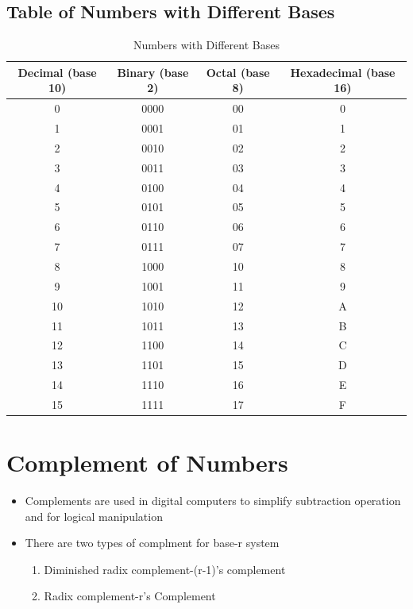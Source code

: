 \documentclass[a4paper,12pt]{article}
\begin{document}
	\subsection*{Table of Numbers with Different Bases}
	\begin{table}[h!]
		\centering
		\begin{tabular}{cccc}
			\toprule
			\textbf{Decimal (base 10)} & \textbf{Binary (base 2)} & \textbf{Octal (base 8)} & \textbf{Hexadecimal (base 16)} \\
			\midrule
			0 & 0000 & 00 & 0 \\
			1 & 0001 & 01 & 1 \\
			2 & 0010 & 02 & 2 \\
			3 & 0011 & 03 & 3 \\
			4 & 0100 & 04 & 4 \\
			5 & 0101 & 05 & 5 \\
			6 & 0110 & 06 & 6 \\
			7 & 0111 & 07 & 7 \\
			8 & 1000 & 10 & 8 \\
			9 & 1001 & 11 & 9 \\
			10 & 1010 & 12 & A \\
			11 & 1011 & 13 & B \\
			12 & 1100 & 14 & C \\
			13 & 1101 & 15 & D \\
			14 & 1110 & 16 & E \\
			15 & 1111 & 17 & F \\
			\bottomrule
		\end{tabular}
		\caption{Numbers with Different Bases}
	\end{table}

\newpage

\section{Complement of Numbers}

\begin{itemize}
    \item Complements are used in digital computers to simplify subtraction operation and for logical manipulation
    \item There are two types of complment for base-r system
    \begin{enumerate}
        \item Diminished radix complement-(r-1)'s complement
        \item Radix complement-r's Complement
    \end{enumerate}
\end{itemize}
\end{document}
